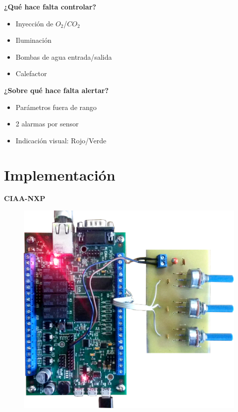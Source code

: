\documentclass[11pt]{beamer}
\begin{document}
\begin{frame}{\textbf{\LARGE{¿Qué hace falta controlar?}}}
\fontsize{18pt}{18}\selectfont
\begin{minipage}[c]{1.0\linewidth}
    \centering
	\begin{itemize}
		\vspace{-20px}
		\item Inyección de $O_2$/$CO_2$
		\vspace{15px}
		\item Iluminación
		\vspace{15px}
		\item Bombas de agua entrada/salida
		\vspace{15px}
		\item Calefactor
	\end{itemize}
\end{minipage}
\end{frame}

\begin{frame}{\textbf{\LARGE{¿Sobre qué hace falta alertar?}}}
\fontsize{18pt}{18}\selectfont
\begin{itemize}
	\item Parámetros fuera de rango
	\vspace{20px}
	\item 2 alarmas por sensor
	\vspace{20px}
	\item Indicación visual: Rojo/Verde
\end{itemize}	
\end{frame}


\section{Implementación}

\begin{frame}{\textbf{\LARGE{CIAA-NXP}}}
	\vspace{-.7cm}
	\begin{figure}[H]
		{\includegraphics[width=.7\textwidth]{./imagenes/ciaa.png}}
	\end{figure}	
\end{frame}
\end{document}
